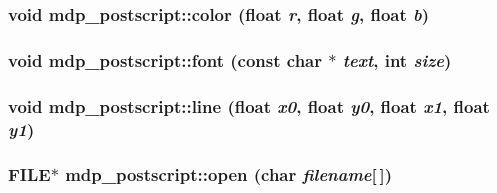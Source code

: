 \label{classmdp__postscript_af41a3aa09549d5acb2b5e9a098f69089}
\hypertarget{classmdp__postscript_ae4c5ce5c229ad7cfef67a689c77acac3}{
\subsubsection[{color}]{\setlength{\rightskip}{0pt plus 5cm}void mdp\_\-postscript::color (float {\em r}, \/  float {\em g}, \/  float {\em b})}}
\label{classmdp__postscript_ae4c5ce5c229ad7cfef67a689c77acac3}
\hypertarget{classmdp__postscript_a296dff78ebec7c38e3c39d97d3743172}{
\subsubsection[{font}]{\setlength{\rightskip}{0pt plus 5cm}void mdp\_\-postscript::font (const char $\ast$ {\em text}, \/  int {\em size})}}
\label{classmdp__postscript_a296dff78ebec7c38e3c39d97d3743172}
\hypertarget{classmdp__postscript_a99a00f3641062e5beef501f07baa7785}{
\subsubsection[{line}]{\setlength{\rightskip}{0pt plus 5cm}void mdp\_\-postscript::line (float {\em x0}, \/  float {\em y0}, \/  float {\em x1}, \/  float {\em y1})}}
\label{classmdp__postscript_a99a00f3641062e5beef501f07baa7785}
\hypertarget{classmdp__postscript_a2c2ab911f52c386532b769dda793dcdc}{
\subsubsection[{open}]{\setlength{\rightskip}{0pt plus 5cm}FILE$\ast$ mdp\_\-postscript::open (char {\em filename}\mbox{[}$\,$\mbox{]})}}
\label{classmdp__postscript_a2c2ab911f52c386532b769dda793dcdc}
